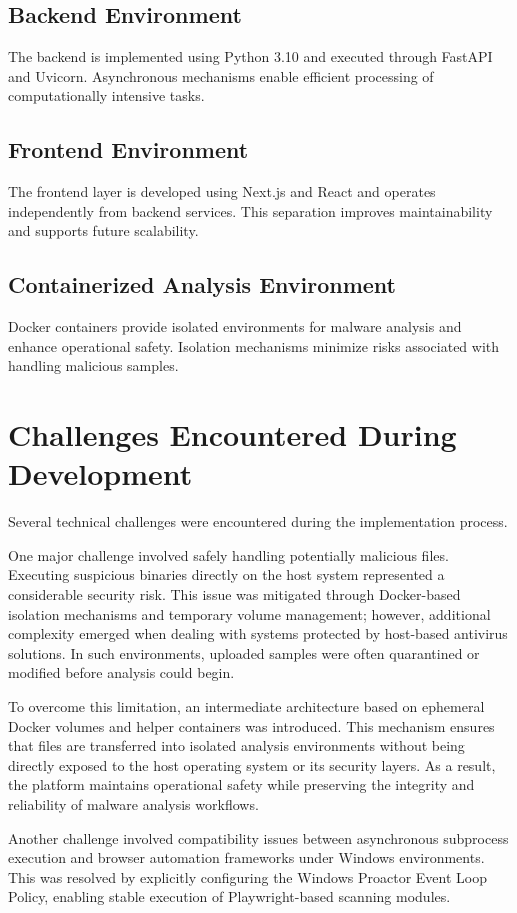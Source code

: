 \subsection{Backend Environment}
The backend is implemented using Python 3.10 and executed through FastAPI and Uvicorn. Asynchronous mechanisms enable efficient processing of computationally intensive tasks.

\subsection{Frontend Environment}
The frontend layer is developed using Next.js and React and operates independently from backend services. This separation improves maintainability and supports future scalability.

\subsection{Containerized Analysis Environment}
Docker containers provide isolated environments for malware analysis and enhance operational safety. Isolation mechanisms minimize risks associated with handling malicious samples.

\section{Challenges Encountered During Development}
Several technical challenges were encountered during the implementation process.

One major challenge involved safely handling potentially malicious files. Executing suspicious binaries directly on the host system represented a considerable security risk. This issue was mitigated through Docker-based isolation mechanisms and temporary volume management; however, additional complexity emerged when dealing with systems protected by host-based antivirus solutions. In such environments, uploaded samples were often quarantined or modified before analysis could begin.

To overcome this limitation, an intermediate architecture based on ephemeral Docker volumes and helper containers was introduced. This mechanism ensures that files are transferred into isolated analysis environments without being directly exposed to the host operating system or its security layers. As a result, the platform maintains operational safety while preserving the integrity and reliability of malware analysis workflows.

Another challenge involved compatibility issues between asynchronous subprocess execution and browser automation frameworks under Windows environments. This was resolved by explicitly configuring the Windows Proactor Event Loop Policy, enabling stable execution of Playwright-based scanning modules.

